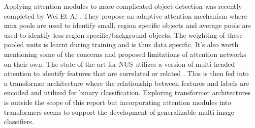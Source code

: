 \documentclass[8pt]{article}
\begin{document}
\newline
Applying attention modules to more complicated object detection was recently completed by Wei Et Al \cite{WeiObjDet2021}. They propose an adaptive attention mechanism where max pools are used to identify small, region specific objects and average pools are used to identify less region specific/background objects. The weighting of these pooled units is learnt during training and is thus data specific.
\newline
\newline
It's also worth mentioning some of the concerns and proposed limitations of attention networks on their own. The state of the art for NUS utilizes a version of multi-headed attention to identify features that are correlated or related \cite{liu2021query2label}. This is then fed into a transformer architecture where the relationship between features and labels are encoded and utilized for binary classification. Exploring transformer architectures is outside the scope of this report but incorporating attention modules into transformers seems to support the development of generalizable multi-image classifiers.


\end{document}

